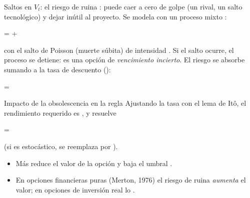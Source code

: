 \begin{frame}{Saltos en $V_t$: el riesgo de ruina}
  :  puede caer a cero de golpe
  (un rival, un salto tecnológico) y dejar inútil al proyecto. Se modela con un
  proceso mixto :
  \begin{ecmed}
     =  + 
  \end{ecmed}
  con  el salto de Poisson (muerte súbita) de intensidad
  \az{$\lambda$}. Si el salto ocurre, el proceso se detiene: es una opción de
  \emph{vencimiento incierto}. El riesgo se absorbe sumando \az{$\lambda$}
  a la tasa de descuento (\az{$\mu \to \mu+\lambda$}):
  \begin{ecmed}
     = 
  \end{ecmed}
\end{frame}

\begin{frame}{Impacto de la obsolescencia en la regla}
  Ajustando la tasa con el lema de Itô, el rendimiento requerido es
  , y \rj{$\varepsilon$} resuelve
  \begin{ecmed}
    \rj{\varepsilon} = 
  \end{ecmed}
  (si  es estocástico,  se reemplaza por ).
  \begin{itemize}
    \item Más \az{$\lambda$} reduce el valor de la opción y baja el
          umbral .
    \item En opciones financieras puras (Merton, 1976) el riesgo de ruina
          \emph{aumenta} el valor; en opciones de inversión real lo
          .
  \end{itemize}
\end{frame}
